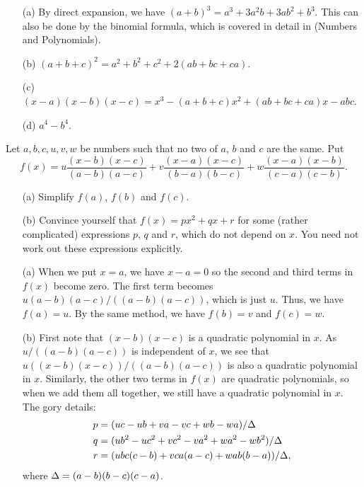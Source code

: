 \documentclass[a4paper]{book}
\theoremstyle{definition}
\newenvironment{starex}{
 \renewcommand{\thetheorem}{\arabic{chapter}.\arabic{section}.\arabic{theorem}${}^*$}
 \exercise
}{\endexercise}
\renewenvironment{solution}{\SolutionInline}{\endSolutionInline}
\begin{document}
\begin{solution}
 \begin{itemize}
  \item[(a)] By direct expansion, we have
   $(a+b)^3=a^3+3a^2b+3ab^2+b^3$.  This can also be done by the
   binomial formula, which is covered in detail in  (Numbers
   and Polynomials).
  \item[(b)] $(a+b+c)^2=a^2+b^2+c^2+2(ab+bc+ca)$.
  \item[(c)] $(x-a)(x-b)(x-c)=x^3-(a+b+c)x^2+(ab+bc+ca)x-abc$.
  \item[(d)] $a^4-b^4$.
 \end{itemize}
\end{solution}

\begin{starex}
 Let $a,b,c,u,v,w$ be numbers such that no two of $a$, $b$ and $c$ are
 the same.  Put
 \[ f(x) = u\frac{(x-b)(x-c)}{(a-b)(a-c)} +
           v\frac{(x-a)(x-c)}{(b-a)(b-c)} +
           w\frac{(x-a)(x-b)}{(c-a)(c-b)}.
 \]
 \begin{itemize}
  \item[(a)] Simplify $f(a)$, $f(b)$ and $f(c)$.
  \item[(b)] Convince yourself that $f(x)=px^2+qx+r$ for some (rather
   complicated) expressions $p$, $q$ and $r$, which do not depend on
   $x$.  You need not work out these expressions explicitly.
 \end{itemize}
\end{starex}
\begin{solution}
 \begin{itemize}
  \item[(a)] When we put $x=a$, we have $x-a=0$ so the second and
   third terms in $f(x)$ become zero.  The first term becomes
   $u(a-b)(a-c)/((a-b)(a-c))$, which is just $u$.  Thus, we have
   $f(a)=u$.  By the same method, we have $f(b)=v$ and $f(c)=w$.
  \item[(b)] First note that $(x-b)(x-c)$ is a quadratic polynomial in
   $x$.  As $u/((a-b)(a-c))$ is independent of $x$, we see that
   $u((x-b)(x-c))/((a-b)(a-c))$ is also a quadratic polynomial in
   $x$.  Similarly, the other two terms in $f(x)$ are quadratic
   polynomials, so when we add them all together, we still have a
   quadratic polynomial in $x$.  The gory details:
   \begin{align*}
    p &= (uc-ub+va-vc+wb-wa)/\Delta \\
    q &= (ub^2-uc^2+vc^2-va^2+wa^2-wb^2)/\Delta \\
    r &= (ubc(c-b) + vca(a-c) + wab(b-a))/\Delta,
   \end{align*}
   where $\Delta=(a-b)(b-c)(c-a)$.
 \end{itemize}
\end{solution}
\end{document}

